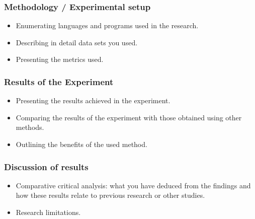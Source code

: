 \documentclass[aspectratio=169]{beamer}
\begin{document}
\begin{frame}
    \frametitle{Methodology / Experimental setup}
    
    \begin{itemize}
        \item Enumerating languages and programs used in the research.
        \newline
        \item Describing in detail data sets you used.
        \newline
        \item Presenting the metrics used.
    \end{itemize}
    
\end{frame}



\begin{frame}
    \frametitle{Results of the Experiment}
    
    \begin{itemize}
        \item Presenting the results achieved in the experiment.
        \newline
        \item Comparing the results of the experiment with those obtained using other methods.
        \newline
        \item Outlining the benefits of the used method.
    \end{itemize}
    
\end{frame}



\begin{frame}
    \frametitle{Discussion of results}
    
    \begin{itemize}
        \item Comparative critical analysis: what you have deduced from the findings and how these results relate to previous research or other studies.
        \newline
        \item Research limitations.
    \end{itemize}
    
\end{frame}
\end{document}

